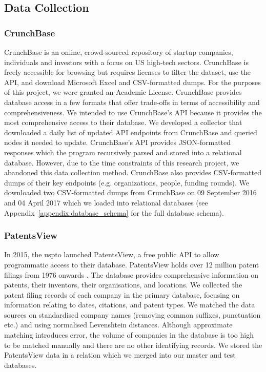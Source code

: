 \documentclass[../thesis/thesis.tex]{subfiles}
\begin{document}
\subsection{Data Collection}

\subsubsection{CrunchBase}

CrunchBase is an online, crowd-sourced repository of startup companies, individuals and investors with a focus on US high-tech sectors. CrunchBase is freely accessible for browsing but requires licenses to filter the dataset, use the API, and download Microsoft Excel and CSV-formatted dumps. For the purposes of this project, we were granted an Academic License. CrunchBase provides database access in a few formats that offer trade-offs in terms of accessibility and comprehensiveness. We intended to use CrunchBase's API because it provides the most comprehensive access to their database. We developed a collector that downloaded a daily list of updated API endpoints from CrunchBase and queried nodes it needed to update. CrunchBase's API provides JSON-formatted responses which the program recursively parsed and stored into a relational database. However, due to the time constraints of this research project, we abandoned this data collection method. CrunchBase also provides CSV-formatted dumps of their key endpoints (e.g. organizations, people, funding rounds). We downloaded two CSV-formatted dumps from CrunchBase on 09 September 2016 and 04 April 2017 which we loaded into relational databases (see Appendix~\ref{appendix:database_schema} for the full database schema).

\subsubsection{PatentsView}

In 2015, the \gls{uspto} launched PatentsView, a free public API to allow programmatic access to their database. PatentsView holds over 12 million patent filings from 1976 onwards \cite{schultz2016}. The database provides comprehensive information on patents, their inventors, their organisations, and locations. We collected the patent filing records of each company in the primary database, focusing on information relating to dates, citations, and patent types. We matched the data sources on standardised company names (removing common suffixes, punctuation etc.) and using normalised Levenshtein distances. Although approximate matching introduces error, the volume of companies in the database is too high to be matched manually and there are no other identifying records. We stored the PatentsView data in a relation which we merged into our master and test databases.
\end{document}
